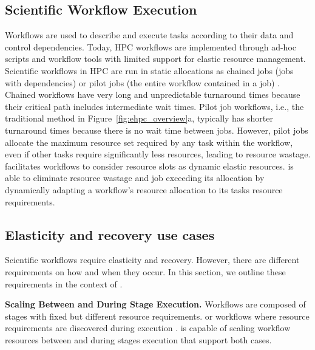 \subsection{Scientific Workflow Execution}
\label{sec:ScientificWorkflows}
Workflows are used to describe and execute tasks
according to their data and control dependencies.
Today, HPC workflows are implemented through ad-hoc scripts and
workflow tools \cite{deelman2005pegasus, wilde2011swift} with limited
support for elastic resource management. Scientific workflows in HPC
are run in static allocations as chained jobs (jobs with dependencies)
or pilot jobs (the entire workflow contained in a job)
\cite{rodrigo2017enabling}.  Chained workflows have very long and
unpredictable turnaround times because their critical path includes
intermediate wait times.  Pilot job workflows, i.e., the traditional
method in Figure~\ref{fig:ehpc_overview}a, typically has shorter turnaround
times because there is no wait time between jobs.  However, pilot jobs
allocate the maximum resource set required by any task within the
workflow, even if other tasks require significantly less resources,
leading to resource wastage.  
\systemname facilitates workflows to consider resource
slots as dynamic elastic resources. \systemname is able to eliminate
resource wastage and job exceeding its allocation by dynamically adapting a
workflow's resource allocation to its tasks resource requirements.

\vspace{-0.3cm}
\subsection{Elasticity and recovery use cases}
\label{sec:backgroundUseCases}
Scientific workflows require elasticity and recovery. 
However, there are different requirements on how
and when they occur. In this section, we outline these requirements 
in the context of \systemname.

\noindent \textbf{Scaling Between and During Stage Execution.}
Workflows are composed of stages with fixed but different resource
requirements.  or workflows where resource requirements are discovered
during execution \cite{klein2011rms}.
\systemname is capable of scaling workflow resources between and
during stages execution that support both cases.


